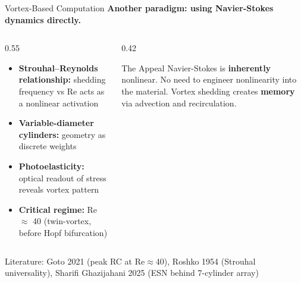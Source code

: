\documentclass[aspectratio=169,11pt]{beamer}
\begin{document}
\begin{frame}{Vortex-Based Computation}
  \textbf{Another paradigm: using Navier-Stokes dynamics directly.}

  \vspace{0.2cm}
  \begin{columns}[T]
    \begin{column}{0.55\textwidth}
      \begin{itemize}
        \item \textbf{Strouhal--Reynolds relationship:} shedding frequency vs Re acts as a nonlinear activation
        \item \textbf{Variable-diameter cylinders:} geometry as discrete weights
        \item \textbf{Photoelasticity:} optical readout of stress reveals vortex pattern
        \item \textbf{Critical regime:} Re $\approx$ 40 (twin-vortex, before Hopf bifurcation)
      \end{itemize}
    \end{column}
    \begin{column}{0.42\textwidth}
      \begin{block}{\footnotesize The Appeal}
        \footnotesize
        Navier-Stokes is \textbf{inherently} nonlinear. No need to engineer nonlinearity into the material. Vortex shedding creates \textbf{memory} via advection and recirculation.
      \end{block}
    \end{column}
  \end{columns}

  \vspace{0.3cm}
  \textcolor{gdpDarkBlue}{\small Literature: Goto 2021 (peak RC at Re$\approx$40), Roshko 1954 (Strouhal universality), Sharifi Ghazijahani 2025 (ESN behind 7-cylinder array)}
\end{frame}
\end{document}
